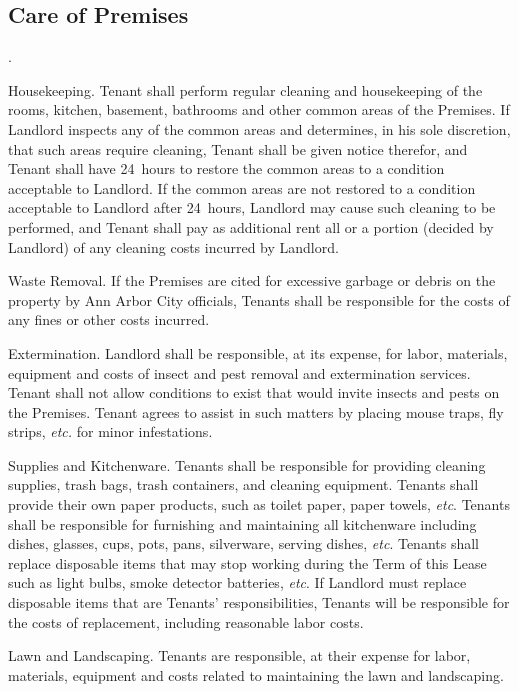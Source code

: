 \documentclass{article}
\begin{document}
\subsection{Care of Premises}
\begin{compactList}{.}{}
  \item {\titleStyle Housekeeping.} Tenant shall perform regular cleaning and
  housekeeping of the rooms, kitchen, basement, bathrooms and other common areas
  of the Premises. If Landlord inspects any of the common areas and determines,
  in his sole discretion, that such areas require cleaning, Tenant shall be
  given notice therefor, and Tenant shall have 24~hours to restore the common
  areas to a condition acceptable to Landlord. If the common areas are not
  restored to a condition acceptable to Landlord after 24~hours, Landlord may
  cause such cleaning to be performed, and Tenant shall pay as additional rent
  all or a portion (decided by Landlord) of any cleaning costs incurred by
  Landlord.

  \item {\titleStyle Waste Removal.} If the Premises are cited for excessive
  garbage or debris on the property by Ann Arbor City officials, Tenants shall
  be responsible for the costs of any fines or other costs incurred.

  \item {\titleStyle Extermination.} Landlord shall be responsible, at its
  expense, for labor, materials, equipment and costs of insect and pest removal
  and extermination services. Tenant shall not allow conditions to exist that
  would invite insects and pests on the Premises. Tenant agrees to assist in
  such matters by placing mouse traps, fly strips, \textit{etc.} for minor
  infestations.

  \item {\titleStyle Supplies and Kitchenware.} Tenants shall be responsible for
  providing cleaning supplies, trash bags, trash containers, and cleaning
  equipment. Tenants shall provide their own paper products, such as toilet
  paper, paper towels, \textit{etc}. Tenants shall be responsible for furnishing
  and maintaining all kitchenware including dishes, glasses, cups, pots, pans,
  silverware, serving dishes, \textit{etc}. Tenants shall replace disposable
  items that may stop working during the Term of this Lease such as light bulbs,
  smoke detector batteries, \textit{etc}. If Landlord must replace disposable
  items that are Tenants’ responsibilities, Tenants will be responsible for the
  costs of replacement, including reasonable labor costs.

  \item {\titleStyle Lawn and Landscaping.} Tenants are responsible, at their
  expense for labor, materials, equipment and costs related to maintaining the
  lawn and landscaping.
\end{compactList}
\end{document}

